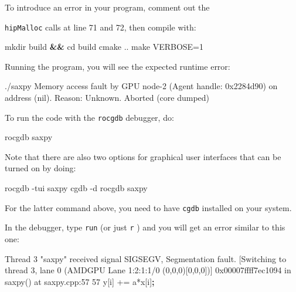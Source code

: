 \documentclass[
]{article}
\let\oldtexttt\texttt
\renewcommand{\texttt}[1]{
  \colorbox{Light}{\oldtexttt{#1}}
}
\newenvironment{Shaded}{}{}
\newcommand{\BuiltInTok}[1]{#1}
\newcommand{\ExtensionTok}[1]{#1}
\newcommand{\FunctionTok}[1]{\textcolor[rgb]{0.02,0.16,0.49}{#1}}
\newcommand{\KeywordTok}[1]{\textcolor[rgb]{0.00,0.44,0.13}{\textbf{#1}}}
\newcommand{\NormalTok}[1]{#1}
\newcommand{\StringTok}[1]{\textcolor[rgb]{0.25,0.44,0.63}{#1}}
\begin{document}
To introduce an error in your program, comment out the
\texttt{hipMalloc} calls at line 71 and 72, then compile with:

\begin{Shaded}
\begin{Highlighting}[]
\FunctionTok{mkdir}\NormalTok{ build }\KeywordTok{\&\&} \BuiltInTok{cd}\NormalTok{ build}
\FunctionTok{cmake}\NormalTok{ ..}
\FunctionTok{make}\NormalTok{ VERBOSE=1}
\end{Highlighting}
\end{Shaded}

Running the program, you will see the expected runtime error:

\begin{Shaded}
\begin{Highlighting}[]
\ExtensionTok{./saxpy}
\ExtensionTok{Memory}\NormalTok{ access fault by GPU node{-}2 (Agent handle: 0x2284d90) }\ExtensionTok{on}\NormalTok{ address (nil)}\BuiltInTok{.} \ExtensionTok{Reason}\NormalTok{: Unknown.}
\ExtensionTok{Aborted}\NormalTok{ (core dumped)}
\end{Highlighting}
\end{Shaded}

To run the code with the \texttt{rocgdb} debugger, do:

\begin{Shaded}
\begin{Highlighting}[]
\ExtensionTok{rocgdb}\NormalTok{ saxpy}
\end{Highlighting}
\end{Shaded}

Note that there are also two options for graphical user interfaces that
can be turned on by doing:

\begin{Shaded}
\begin{Highlighting}[]
\ExtensionTok{rocgdb}\NormalTok{ {-}tui saxpy}
\ExtensionTok{cgdb}\NormalTok{ {-}d rocgdb saxpy }
\end{Highlighting}
\end{Shaded}

For the latter command above, you need to have \texttt{cgdb} installed
on your system.

In the debugger, type \texttt{run} (or just \texttt{r}) and you will get
an error similar to this one:

\begin{Shaded}
\begin{Highlighting}[]
\ExtensionTok{Thread}\NormalTok{ 3 }\StringTok{"saxpy"}\NormalTok{ received signal SIGSEGV, Segmentation fault.}
\NormalTok{[}\ExtensionTok{Switching}\NormalTok{ to thread 3, lane 0 (AMDGPU Lane 1:2:1:1/0 (0,0,0)[}\ExtensionTok{0}\NormalTok{,0,0])]}
\ExtensionTok{0x00007ffff7ec1094}\NormalTok{ in saxpy() }\ExtensionTok{at}\NormalTok{ saxpy.cpp:57}
\ExtensionTok{57}\NormalTok{    y[i] += a*x[i]}\KeywordTok{;}
\end{Highlighting}
\end{Shaded}
\end{document}
